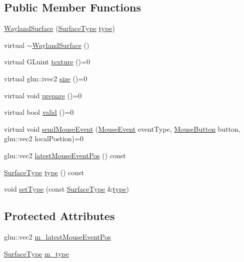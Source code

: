 \subsection*{Public Member Functions}
\begin{DoxyCompactItemize}
\item 
\hyperlink{classmotorcar_1_1WaylandSurface_a3d89131a3967483a4b8e31abae122059}{Wayland\-Surface} (\hyperlink{classmotorcar_1_1WaylandSurface_a7715a41b6776800656722407ec01e0a5}{Surface\-Type} \hyperlink{classmotorcar_1_1WaylandSurface_a0e6e5e2455666f607a8ddb2479ba8e88}{type})
\item 
virtual \hyperlink{classmotorcar_1_1WaylandSurface_a9b6ec8218ecc975308ddb38ddf3dd965}{$\sim$\-Wayland\-Surface} ()
\item 
virtual G\-Luint \hyperlink{classmotorcar_1_1WaylandSurface_aa8ae13d97dae8dfbb610ca6f4ab2b745}{texture} ()=0
\item 
virtual glm\-::ivec2 \hyperlink{classmotorcar_1_1WaylandSurface_a06182d612aaf0d07780e498066aaca1b}{size} ()=0
\item 
virtual void \hyperlink{classmotorcar_1_1WaylandSurface_a63669771c03ce580fec8a0099dbd294e}{prepare} ()=0
\item 
virtual bool \hyperlink{classmotorcar_1_1WaylandSurface_af2f54076ec690f4d478771183c9b0db5}{valid} ()=0
\item 
virtual void \hyperlink{classmotorcar_1_1WaylandSurface_a47d13cf428555400ca7db005f3ea7360}{send\-Mouse\-Event} (\hyperlink{classmotorcar_1_1WaylandSurface_a062651eb16900ed15467b7ce6ccea390}{Mouse\-Event} event\-Type, \hyperlink{classmotorcar_1_1WaylandSurface_a263f154a6a2ac03d747ec61f667f7960}{Mouse\-Button} button, glm\-::vec2 local\-Postion)=0
\item 
glm\-::vec2 \hyperlink{classmotorcar_1_1WaylandSurface_a3b11157b840db9d8b230d9e8eefd9f30}{latest\-Mouse\-Event\-Pos} () const 
\item 
\hyperlink{classmotorcar_1_1WaylandSurface_a7715a41b6776800656722407ec01e0a5}{Surface\-Type} \hyperlink{classmotorcar_1_1WaylandSurface_a0e6e5e2455666f607a8ddb2479ba8e88}{type} () const 
\item 
void \hyperlink{classmotorcar_1_1WaylandSurface_a8806b03b3c4007578f26c1b907303336}{set\-Type} (const \hyperlink{classmotorcar_1_1WaylandSurface_a7715a41b6776800656722407ec01e0a5}{Surface\-Type} \&\hyperlink{classmotorcar_1_1WaylandSurface_a0e6e5e2455666f607a8ddb2479ba8e88}{type})
\end{DoxyCompactItemize}
\subsection*{Protected Attributes}
\begin{DoxyCompactItemize}
\item 
glm\-::vec2 \hyperlink{classmotorcar_1_1WaylandSurface_a9a0fa2f9278e18b7fb53276cf32d000d}{m\-\_\-latest\-Mouse\-Event\-Pos}
\item 
\hyperlink{classmotorcar_1_1WaylandSurface_a7715a41b6776800656722407ec01e0a5}{Surface\-Type} \hyperlink{classmotorcar_1_1WaylandSurface_a73fc5c245e98a08a551c7f412fd95966}{m\-\_\-type}
\end{DoxyCompactItemize}



